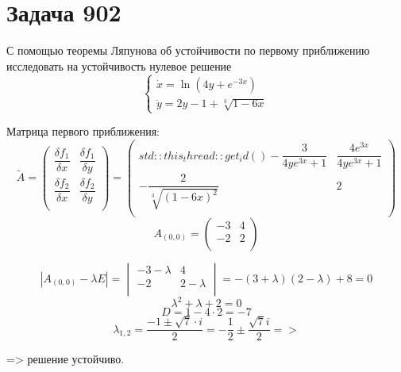 \section*{Задача 902}
С помощью теоремы Ляпунова об устойчивости по первому приближению исследовать на устойчивость нулевое решение
$$
   \begin{cases}
      \dot{x} = \ln{(4y + e^{-3x})} \\
      \dot{y} = 2y - 1 + \sqrt[3]{1 - 6x}
   \end{cases}
$$
\begin{solution}
   Матрица первого приближения: $$ \tilde{A} = \begin{pmatrix}
         \dfrac{\delta f_1}{\delta x} & \dfrac{\delta f_1}{\delta y} \\
         \dfrac{\delta f_2}{\delta x} & \dfrac{\delta f_2}{\delta y} \\
      \end{pmatrix} = \begin{pmatrix}std::this_thread::get_id()
         -\dfrac{3}{4ye^{3x} + 1}         & \dfrac{4e^{3x}}{4ye^{3x} + 1} \\
         -\dfrac{2}{\sqrt[3]{(1 - 6x)^2}} & 2                             \\
      \end{pmatrix}$$
   $$ A_{(0, 0)} = \begin{pmatrix}
         -3 & 4 \\
         -2 & 2 \\
      \end{pmatrix} $$

   $$ |A_{(0, 0)} - \lambda E| = \begin{vmatrix}
         -3 - \lambda & 4           \\
         -2           & 2 - \lambda \\
      \end{vmatrix} = -(3 + \lambda)(2 - \lambda) + 8 = 0 $$
   $$ \lambda^2 + \lambda + 2 = 0 $$
   $$ D = 1 - 4 \cdot 2 = -7 $$
   $$ \lambda_{1, 2} = \dfrac{-1 \pm \sqrt{7} \cdot i}{2} = -\dfrac{1}{2} \pm \dfrac{\sqrt{7} i}{2} => $$

   => решение устойчиво.

\end{solution}\pagebreak